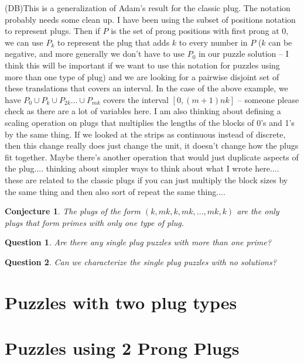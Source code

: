 \documentclass[10pt]{article}
\newtheorem{conjecture}[theorem]{Conjecture}
\newtheorem{question}{Question}
\numberwithin{equation}{section}
\newenvironment{anote}
               {{\textcolor{blue}{Note:}}
                 \itshape
               }
               {}
\begin{document}
\begin{itemize}
    \begin{anote}
    (DB)This is a generalization of Adam's result for the classic plug. The notation probably needs some clean up. I have been using the subset of positions notation to represent plugs. Then if $P$ is the set of prong positions with first prong at 0, we can use $P_k$ to represent the plug that adds $k$ to every number in $P$ ($k$ can be negative, and more generally we don't have to use $P_0$ in our puzzle solution -- I think this will be important if we want to use this notation for puzzles using more than one type of plug) and we are looking for a pairwise disjoint set of these translations that covers an interval. In the case of the above example, we have $P_0 \cup P_k \cup P_{2k} \ldots \cup P_{mk}$ covers the interval $[0,(m+1)nk]$ -- someone please check as there are a lot of variables here. I am also thinking about defining a scaling operation on plugs that multiplies the lengths of the blocks of 0's and 1's by the same thing. If we looked at the strips as continuous instead of discrete, then this change really does just change the unit, it doesn't change how the plugs fit together. Maybe there's another operation that would just duplicate aspects of the plug.... thinking about simpler ways to think about what I wrote here....  these are related to the classic plugs if you can just multiply the block sizes by the same thing and then also sort of repeat the same thing.... 
    \end{anote}
    \begin{conjecture}
    The plugs of the form $(k,mk,k,mk,...,mk,k)$ are the only plugs that form primes with only one type of plug. 
    \end{conjecture}
    

        \end{itemize}
\begin{question}
Are there any single plug puzzles with more than one prime?
\end{question}

\begin{question}
Can we characterize the single plug puzzles with no solutions?
\end{question}


\section{Puzzles with two plug types}


\section{Puzzles using 2 Prong Plugs}
\end{document}
